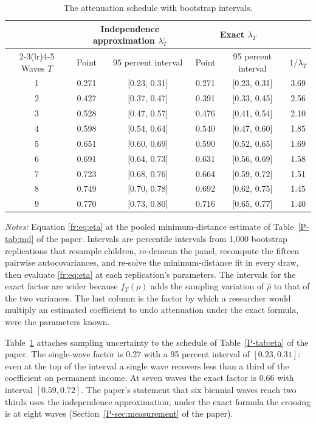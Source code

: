 \begin{table}[!htb]
\centering
\small
\caption{The attenuation schedule with bootstrap intervals.}
\label{fr:tab:etaboot}
\begin{tabular}{@{}cccccc@{}}
\toprule
& \multicolumn{2}{c}{Independence approximation $\lambda^{\circ}_T$} & \multicolumn{2}{c}{Exact $\lambda_T$} & \\
\cmidrule(lr){2-3}\cmidrule(lr){4-5}
Waves $T$ & Point & 95 percent interval & Point & 95 percent interval & $1/\lambda_T$ \\
\midrule
1 & 0.271 & [0.23, 0.31] & 0.271 & [0.23, 0.31] & 3.69 \\
2 & 0.427 & [0.37, 0.47] & 0.391 & [0.33, 0.45] & 2.56 \\
3 & 0.528 & [0.47, 0.57] & 0.476 & [0.41, 0.54] & 2.10 \\
4 & 0.598 & [0.54, 0.64] & 0.540 & [0.47, 0.60] & 1.85 \\
5 & 0.651 & [0.60, 0.69] & 0.590 & [0.52, 0.65] & 1.69 \\
6 & 0.691 & [0.64, 0.73] & 0.631 & [0.56, 0.69] & 1.58 \\
7 & 0.723 & [0.68, 0.76] & 0.664 & [0.59, 0.72] & 1.51 \\
8 & 0.749 & [0.70, 0.78] & 0.692 & [0.62, 0.75] & 1.45 \\
9 & 0.770 & [0.73, 0.80] & 0.716 & [0.65, 0.77] & 1.40 \\
\bottomrule
\end{tabular}
\par\smallskip
\begin{minipage}{0.92\textwidth}
\footnotesize\emph{Notes:} Equation \eqref{fr:eq:eta} at the pooled
minimum-distance estimate of Table~\ref{P-tab:md} of the paper. Intervals
are percentile intervals from 1,000 bootstrap replications that resample
children, re-demean the panel, recompute the fifteen pairwise
autocovariances, and re-solve the minimum-distance fit in every draw, then
evaluate \eqref{fr:eq:eta} at each replication's parameters. The intervals
for the exact factor are wider because $f_T(\rho)$ adds the sampling
variation of $\hat\rho$ to that of the two variances. The last column is
the factor by which a researcher would multiply an estimated coefficient
to undo attenuation under the exact formula, were the parameters known.
\end{minipage}
\end{table}

Table~\ref{fr:tab:etaboot} attaches sampling uncertainty to the schedule
of Table~\ref{P-tab:eta} of the paper. The single-wave factor is 0.27 with a 95 percent interval of $[0.23, 0.31]$: even at the top of the interval a single wave recovers less than a third of the coefficient on permanent income. At seven waves the exact factor is 0.66 with interval $[0.59, 0.72]$. The paper's statement that six biennial waves reach two thirds uses the independence approximation; under the exact formula the crossing is at eight waves (Section~\ref{P-sec:measurement} of the paper).

